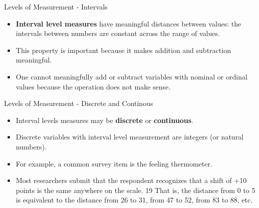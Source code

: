 \documentclass[
  ignorenonframetext,
]{beamer}
\begin{document}
\begin{frame}{Levels of Measurement - Intervals}
\protect\hypertarget{levels-of-measurement---intervals}{}

\begin{itemize}
\item
  \textbf{Interval level measures} have meaningful distances between
  values: the intervals between numbers are constant across the range of
  values.
\item
  This property is important because it makes addition and subtraction
  meaningful.
\item
  One cannot meaningfully add or subtract variables with nominal or
  ordinal values because the operation does not make sense.
\end{itemize}

\end{frame}

\begin{frame}{Levels of Measurement - Discrete and Continous}
\protect\hypertarget{levels-of-measurement---discrete-and-continous}{}

\begin{itemize}
\item
  Interval levels measures may be \textbf{discrete} or
  \textbf{continuous}.
\item
  Discrete variables with interval level measurement are integers (or
  natural numbers).
\item
  For example, a common survey item is the feeling thermometer.
\item
  Most researchers submit that the respondent recognizes that a shift of
  +10 points is the same anywhere on the scale. 19 That is, the distance
  from 0 to 5 is equivalent to the distance from 26 to 31, from 47 to
  52, from 83 to 88, etc.
\end{itemize}

\end{frame}
\end{document}
